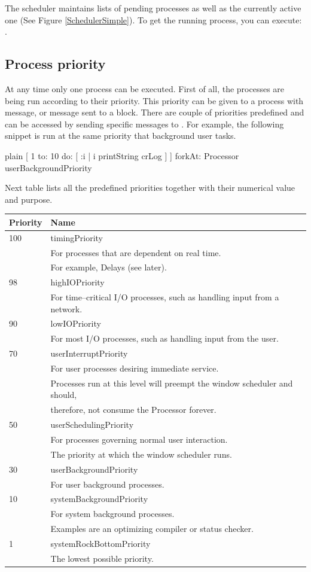\documentclass[10pt,twoside,english]{_support/latex/sbabook/sbabook}
\begin{document}
The scheduler maintains lists of pending processes as well as the currently active one (See Figure \ref{SchedulerSimple}).  
To get the running process, you can execute: .
\subsection{Process priority}
At any time only one process can be executed. First of all, the processes are being run according to their priority. This priority can be given to a process with  message, or  message sent to a block. There are couple of priorities predefined and can be accessed by sending specific messages to . For example, the following snippet is run at the same priority that background user tasks.

\begin{displaycode}{plain}
[ 1 to: 10 do: [ :i | i  printString crLog ]
	] forkAt: Processor userBackgroundPriority
\end{displaycode}

Next table lists all the predefined priorities together with their numerical value and purpose.

\begin{tabular}{lll}
\toprule
\textbf{Priority} & \textbf{Name} &  \\
\midrule
100 & timingPriority &  \\
 & For processes that are dependent on real time. \\
 & For example, Delays (see later). \\
98 & highIOPriority &  \\
 & For time–critical I/O processes, such as handling input from a network. \\
90 & lowIOPriority &  \\
 & For most I/O processes, such as handling input from the user. \\
70 & userInterruptPriority &  \\
 & For user processes desiring immediate service. \\
 & Processes run at this level will preempt the window scheduler and should, \\
 & therefore, not consume the Processor forever. \\
50 & userSchedulingPriority &  \\
 & For processes governing normal user interaction. \\
 & The priority at which the window scheduler runs. \\
30 & userBackgroundPriority \\
 & For user background processes. \\
10 & systemBackgroundPriority \\
 & For system background processes. \\
 & Examples are an optimizing compiler or status checker. \\
1 & systemRockBottomPriority \\
 & The lowest possible priority. \\
\bottomrule
\end{tabular}
\end{document}
